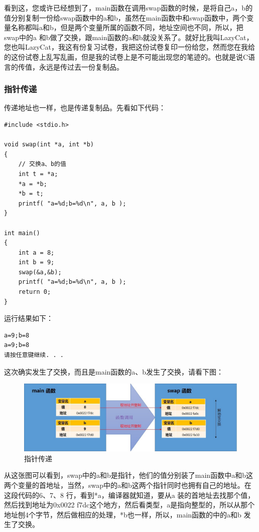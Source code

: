 \documentclass[11pt,twoside,a4paper,titlepage]{article}	%
\begin{document}
看到这，您或许已经想到了，main函数在调用swap函数的时候，是将自己a，b的值分别复制一份给swap函数中的a和b，虽然在main函数中和swap函数中，两个变量名称都叫a和b，但是两个变量所属的函数不同，地址空间也不同，所以，把swap中的a 和b做了交换，跟main函数的a和b就没关系了。就好比我叫LazyCat，您也叫LazyCat，我这有份复习试卷，我把这份试卷复印一份给您，然而您在我给的这份试卷上乱写乱画，但是我的试卷上是不可能出现您的笔迹的。也就是说C语言的传值，永远是传过去一份复制品。

\subsubsection{指针传递}

传递地址也一样，也是传递复制品。先看如下代码：
\begin{lstlisting}
#include <stdio.h>

void swap(int *a, int *b)
{
	// 交换a、b的值
	int t = *a;
	*a = *b;
	*b = t;
	printf( "a=%d;b=%d\n", a, b );
}

int main()
{
	int a = 8;
	int b = 9;
	swap(&a,&b);
	printf( "a=%d;b=%d\n", a, b );
	return 0;
}
\end{lstlisting}

运行结果如下：
\begin{lstlisting}
a=9;b=8
a=9;b=8
请按任意键继续. . .
\end{lstlisting}

这次确实发生了交换，而且是main函数的a、b发生了交换，请看下图：

\begin{figure}[bpht]
\centering
\includegraphics[scale=.5]{../src/swap_03.jpg}
\caption{指针传递}
\label{fig:swap_03}
\end{figure}

从这张图可以看到，swap中的a和b是指针，他们的值分别装了main函数中a和b这两个变量的首地址，当然，swap中的a和b这两个指针同时也拥有自己的地址。在这段代码的6、7、8 行，看到*a，编译器就知道，要从a 装的首地址去找那个值，然后找到地址为0x0022 f7dc这个地方，然后看类型，a是指向整型的，所以从那个地址刨4个字节，然后做相应的处理，*b也一样，所以，main函数的中的a和b 发生了交换。
\end{document}
